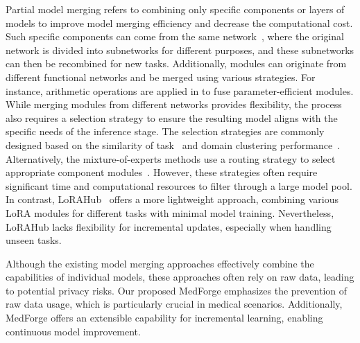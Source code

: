 Partial model merging refers to combining only specific components or layers of models to improve model merging efficiency and decrease the computational cost. 
Such specific components can come from the same network~\cite{kingetsu2021neural}, where the original network is divided into subnetworks for different purposes, and these subnetworks can then be recombined for new tasks.
Additionally, modules can originate from different functional networks and be merged using various strategies. For instance, arithmetic operations are applied in \cite{zhang2023composing} to fuse parameter-efficient modules.
While merging modules from different networks provides flexibility, the process also requires a selection strategy to ensure the resulting model aligns with the specific needs of the inference stage. 
The selection strategies are commonly designed based on the similarity of task~\cite{lv2023parameter} and domain clustering performance~\cite{chronopoulou2023adaptersoup}. Alternatively, the mixture-of-experts methods use a routing strategy to select appropriate component modules~\cite{ponti2023combining}. However, these strategies often require significant time and computational resources to filter through a large model pool. 
In contrast, LoRAHub~\cite{huang2023lorahub} offers a more lightweight approach, combining various LoRA modules for different tasks with minimal model training. Nevertheless, LoRAHub lacks flexibility for incremental updates, especially when handling unseen tasks.

Although the existing model merging approaches effectively combine the capabilities of individual models, these approaches often rely on raw data, leading to potential privacy risks. Our proposed MedForge emphasizes the prevention of raw data usage, which is particularly crucial in medical scenarios. Additionally, MedForge offers an extensible capability for incremental learning, enabling continuous model improvement.


